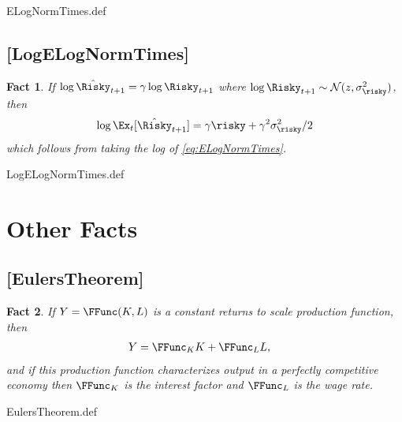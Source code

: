 \documentclass{handout}
\newtheorem{Fact}{Fact}
\begin{document}
\begin{verbatimwrite}{ELogNormTimes.def}
\providecommand{\ELogNormTimes}{\href{https://www.econ2.jhu.edu/people/ccarroll/public/LectureNotes/MathFacts/MathFactsList\#ELogNormTimes}{\ensuremath{\mathtt{[ELogNormTimes]}}}}
\end{verbatimwrite}

\hypertarget{LogELogNormTimes}{}
\subsection{[LogELogNormTimes]}

\begin{Fact} If $\log \hat{\Risky}_{t+1} = \gamma \log \Risky_{t+1}$ where $\log \Risky_{t+1} \sim \mathcal{N}(z,\sigma_{\risky}^{2})$, then
\begin{equation}
        \log \Ex_{t}[\hat{\Risky}_{t+1}] = \gamma \risky+\gamma^{2}\sigma_{\risky}^{2}/2 \label{eq:LogELogNormTimes}
\end{equation}
which follows from taking the log of \eqref{eq:ELogNormTimes}.

\end{Fact}

\begin{verbatimwrite}{LogELogNormTimes.def}
\providecommand{\LogELogNormTimes}{\href{https://www.econ2.jhu.edu/people/ccarroll/public/LectureNotes/MathFacts/MathFactsList\#LogELogNormTimes}{\ensuremath{\mathtt{[LogELogNormTimes]}}}}
\end{verbatimwrite}




\section{Other Facts}

\hypertarget{EulersTheorem}{}
\subsection{[EulersTheorem]}\label{fact:EulersTheorem}

\begin{Fact} If $Y=\FFunc(K,L)$ is a constant returns to scale production
function, then
\begin{equation}\begin{gathered}\begin{aligned}
        Y & =  \FFunc_{K} K + \FFunc_{L} L,
\end{aligned}\end{gathered}\end{equation}
and if this production function characterizes output in a perfectly 
competitive economy then $\FFunc_{K}$ is the interest factor and $\FFunc_{L}$ is
the wage rate.

\end{Fact}
\begin{verbatimwrite}{EulersTheorem.def}
\providecommand{\EulersTheorem}{\href{https://www.econ2.jhu.edu/people/ccarroll/public/LectureNotes/MathFacts/MathFactsList\#EulersTheorem}{\ensuremath{\mathtt{[EulersTheorem]}}}}
\end{verbatimwrite}

\end{document}
